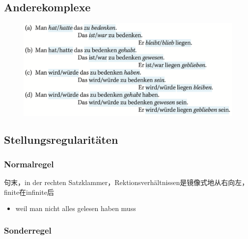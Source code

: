 \documentclass[UTF8]{report}
\begin{document}
\subsection{Anderekomplexe}
\begin{figure}[H]
    \centering
    \includegraphics[scale=0.5]{ap.png}
\end{figure}


\subsection{Stellungsregularitäten}

\subsubsection{Normalregel}
句末，in der rechten Satzklammer，Rektionsverhältnissen是镜像式地从右向左，finite在infinite后
\begin{itemize}
    \item weil man nicht alles gelesen haben muss
\end{itemize}
\subsubsection{Sonderregel}
\end{document}
